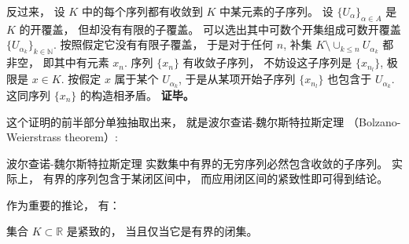 反过来， 设 $K$ 中的每个序列都有收敛到 $K$ 中某元素的子序列。 设 $\{U_\alpha\}_{\alpha\in A}$ 是 $K$ 的开覆盖， 但却没有有限的子覆盖。 可以选出其中可数个开集组成可数开覆盖 $\{U_{\alpha_k}\}_{k\in\mathbb{N}}$. 按照假定它没有有限子覆盖， 于是对于任何 $n$, 补集 $K\setminus\cup_{k\leq n}U_{\alpha_k}$ 都非空， 即其中有元素 $x_n$. 序列 $\{x_n\}$ 有收敛子序列， 不妨设这子序列是 $\{x_{n_l}\}$, 极限是 $x\in K$. 按假定 $x$ 属于某个 $U_{\alpha_k}$, 于是从某项开始子序列 $\{x_{n_l}\}$ 也包含于 $U_{\alpha_k}$. 这同序列 $\{x_n\}$ 的构造相矛盾。 \textbf{证毕。}

这个证明的前半部分单独抽取出来， 就是波尔查诺-魏尔斯特拉斯定理 （Bolzano-Weierstrass theorem）:
\begin{theorem}{波尔查诺-魏尔斯特拉斯定理}
实数集中有界的无穷序列必然包含收敛的子序列。 实际上， 有界的序列包含于某闭区间中， 而应用闭区间的紧致性即可得到结论。
\end{theorem}

作为重要的推论， 有：
\begin{theorem}{}
集合 $K\subset\mathbb{R}$ 是紧致的， 当且仅当它是有界的闭集。
\end{theorem}
